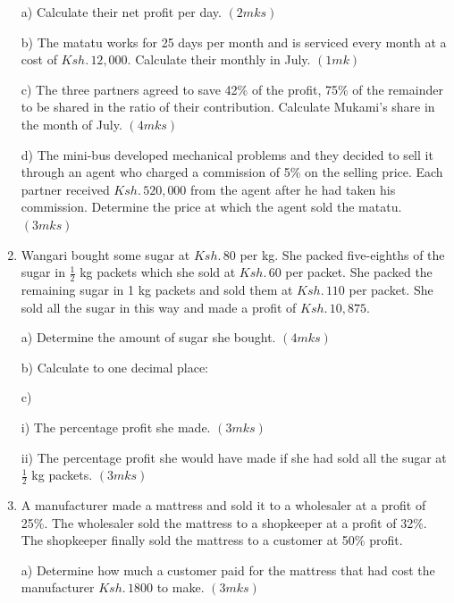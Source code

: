 \documentclass[
  a4paperpaper,
]{scrbook}
\begin{document}
\begin{tcolorbox}
\begin{enumerate}
  a) Calculate their net profit per day. \hspace{7.6cm} \((2mks)\)

  b) The matatu works for 25 days per month and is serviced every month
  at a cost of \(Ksh.\,12, 000\). Calculate their monthly in July.
  \hspace{6.4cm} \((1mk)\)

  c) The three partners agreed to save 42\% of the profit, 75\% of the
  remainder to be shared in the ratio of their contribution. Calculate
  Mukami's share in the month of July. \hspace{1.8cm} \((4mks)\)

  d) The mini-bus developed mechanical problems and they decided to sell
  it through an agent who charged a commission of 5\% on the selling
  price. Each partner received \(Ksh.\, 520,000\) from the agent after
  he had taken his commission. Determine the price at which the agent
  sold the matatu. \hspace{11.25cm} \((3mks)\)
\item
  Wangari bought some sugar at \(Ksh.\, 80\) per kg. She packed
  five-eighths of the sugar in \(\frac {1}{2}\) kg packets which she
  sold at \(Ksh.\, 60\) per packet. She packed the remaining sugar in 1
  kg packets and sold them at \(Ksh.\, 110\) per packet. She sold all
  the sugar in this way and made a profit of \(Ksh.\, 10,875\).

  a) Determine the amount of sugar she bought. \hspace{6.5cm}\((4mks)\)

  b) Calculate to one decimal place:

  c)

  i) The percentage profit she made. \hspace{7.3cm} \((3mks)\)

  ii) The percentage profit she would have made if she had sold all the
  sugar at \(\frac{1}{2}\) kg packets. \hspace{12.8cm} \((3mks)\)
\item
  A manufacturer made a mattress and sold it to a wholesaler at a profit
  of 25\%. The wholesaler sold the mattress to a shopkeeper at a profit
  of 32\%. The shopkeeper finally sold the mattress to a customer at
  50\% profit.

  a) Determine how much a customer paid for the mattress that had cost
  the manufacturer \(Ksh.\, 1800\) to make. \hspace{11cm} \((3mks)\)


\end{enumerate}
\end{tcolorbox}
\end{document}
